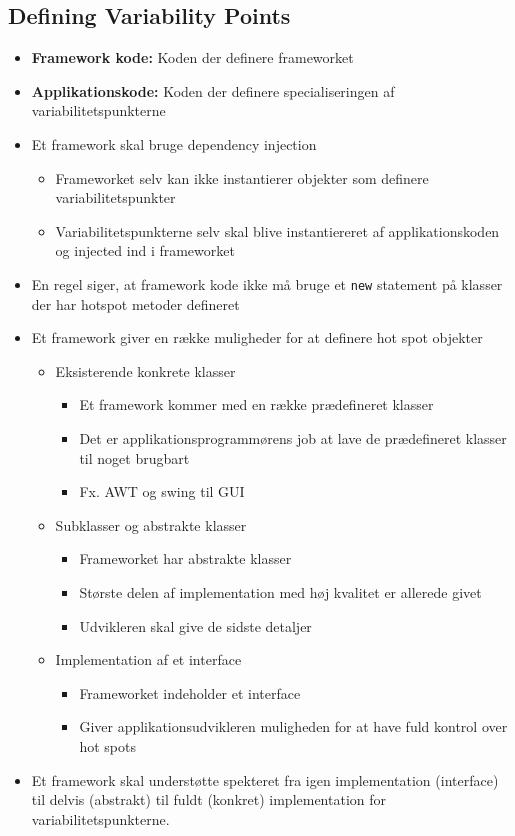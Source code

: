 \documentclass[a4, english]{article}
\begin{document}
\subsection{Defining Variability Points}
\begin{itemize}
  \item \textbf{Framework kode:} Koden der definere frameworket 
  \item \textbf{Applikationskode:} Koden der definere specialiseringen af variabilitetspunkterne  
	\item Et framework skal bruge dependency injection
  \begin{itemize}
  	\item Frameworket selv kan ikke instantierer objekter som definere variabilitetspunkter
    \item Variabilitetspunkterne selv skal blive instantiereret af applikationskoden og injected ind i frameworket 
  \end{itemize}
  \item En regel siger, at framework kode ikke må bruge et \texttt{new} statement på klasser der har hotspot metoder defineret   
  \item Et framework giver en række muligheder for at definere hot spot objekter
  \begin{itemize}
  	\item Eksisterende konkrete klasser 
    \begin{itemize}
    	\item Et framework kommer med en række prædefineret klasser 
      \item Det er applikationsprogrammørens job at lave de prædefineret klasser til noget brugbart
      \item Fx. AWT og swing til GUI
    \end{itemize}
    \item Subklasser og abstrakte klasser
    \begin{itemize}
    	\item Frameworket har abstrakte klasser
      \item Største delen af implementation med høj kvalitet er allerede givet
      \item Udvikleren skal give de sidste detaljer 
    \end{itemize}
    \item Implementation af et interface
    \begin{itemize}
    	\item Frameworket indeholder et interface
      \item Giver applikationsudvikleren muligheden for at have fuld kontrol over hot spots 
    \end{itemize}
  \end{itemize} 
  \item Et framework skal understøtte spekteret fra igen implementation (interface) til delvis (abstrakt) til fuldt (konkret) implementation for variabilitetspunkterne.
\end{itemize}
\end{document}
